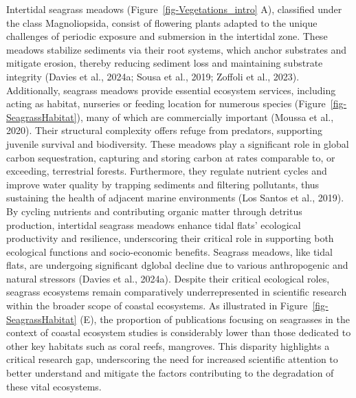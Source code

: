 \documentclass[
  letterpaper,
  11pt,
  english,
  singlespacing,
  headsepline]{MastersDoctoralThesis}
\begin{document}
\begin{spacing}{1.5}
Intertidal seagrass meadows (Figure~\ref{fig-Vegetations_intro} A),
classified under the class Magnoliopsida, consist of flowering plants
adapted to the unique challenges of periodic exposure and submersion in
the intertidal zone. These meadows stabilize sediments via their root
systems, which anchor substrates and mitigate erosion, thereby reducing
sediment loss and maintaining substrate integrity (Davies et al., 2024a;
Sousa et al., 2019; Zoffoli et al., 2023). Additionally, seagrass
meadows provide essential ecosystem services, including acting as
habitat, nurseries or feeding location for numerous species
(Figure~\ref{fig-SeagrassHabitat}), many of which are commercially
important (Moussa et al., 2020). Their structural complexity offers
refuge from predators, supporting juvenile survival and biodiversity.
These meadows play a significant role in global carbon sequestration,
capturing and storing carbon at rates comparable to, or exceeding,
terrestrial forests. Furthermore, they regulate nutrient cycles and
improve water quality by trapping sediments and filtering pollutants,
thus sustaining the health of adjacent marine environments (Los Santos
et al., 2019). By cycling nutrients and contributing organic matter
through detritus production, intertidal seagrass meadows enhance tidal
flats' ecological productivity and resilience, underscoring their
critical role in supporting both ecological functions and socio-economic
benefits. Seagrass meadows, like tidal flats, are undergoing significant
dglobal decline due to various anthropogenic and natural stressors
(Davies et al., 2024a). Despite their critical ecological roles,
seagrass ecosystems remain comparatively underrepresented in scientific
research within the broader scope of coastal ecosystems. As illustrated
in Figure~\ref{fig-SeagrassHabitat} (E), the proportion of publications
focusing on seagrasses in the context of coastal ecosystem studies is
considerably lower than those dedicated to other key habitats such as
coral reefs, mangroves. This disparity highlights a critical research
gap, underscoring the need for increased scientific attention to better
understand and mitigate the factors contributing to the degradation of
these vital ecosystems.

\newpage


\end{spacing}
\end{document}
